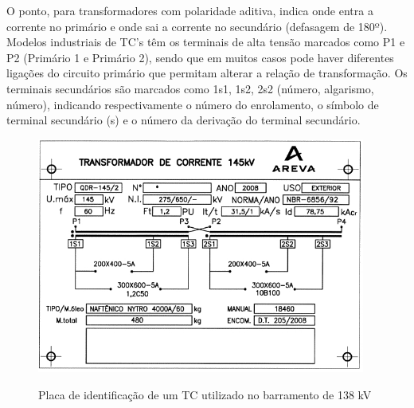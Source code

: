 \documentclass[a5paper,english,spanish,brazil]{ufsc-thesis}
\begin{document}
			O ponto, para transformadores com polaridade aditiva, indica onde entra a corrente no primário e onde sai a corrente no secundário (defasagem de 180º). Modelos industriais de TC’s têm os terminais de alta tensão marcados como P1 e P2 (Primário 1 e Primário 2), sendo que em muitos casos pode haver diferentes ligações do circuito primário que permitam alterar a relação de transformação. Os terminais secundários são marcados como 1s1, 1s2, 2s2 (número, algarismo, número), indicando respectivamente o número do enrolamento, o símbolo de terminal secundário (s) e o número da derivação do terminal secundário.\par
			\begin{figure}[htb]
			  \caption{Placa de identificação de um TC utilizado no barramento de 138 kV}
			  \centering
			  \includegraphics[width=10.8cm]{placatc.jpg}
			  \label{fig:placatc}
			\end{figure}
\end{document}

